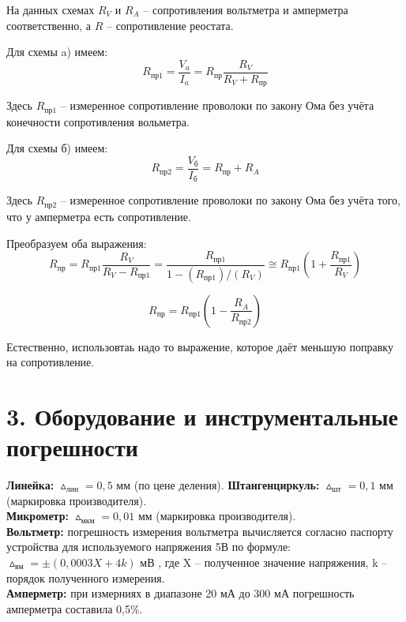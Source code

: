 На данных схемах $R_V$ и $R_A$ -- сопротивления вольтметра и амперметра соответственно, а $R$ -- сопротивление реостата.

Для схемы a) имеем:
\[R_{\text{пр1}} = \frac{V_a}{I_a} = R_{\text{пр}} \frac{R_V}{R_V + R_{\text{пр}}} \]

Здесь $R_{\text{пр1}}$ -- измеренное сопротивление проволоки по закону Ома без учёта конечности сопротивления вольметра.

Для схемы б) имеем:
\[R_{\text{пр2}} = \frac{V_{\text{б}}}{I_{\text{б}}} = R_{\text{пр}} + R_A\]

Здесь $R_{\text{пр2}}$ -- измеренное сопротивление проволоки по закону Ома без учёта того, что у амперметра есть сопротивление.

Преобразуем оба выражения:
\[R_{\text{пр}} = R_{\text{пр1}} \frac{R_V}{R_V - R_{\text{пр1}}} = \frac{R_{\text{пр1}}}{1 - (R_{\text{пр1}})/(R_V)} \cong R_{\text{пр1}} (1 + \frac{R_{\text{пр1}}}{R_V})\]

\[R_{\text{пр}} = R_{\text{пр1}} (1 - \frac{R_A}{R_{\text{пр2}}})\]

Естественно, использовтаь надо то выражение, которое даёт меньшую поправку на сопротивление.\\

\section*{3. Оборудование и инструментальные погрешности}


\textbf{Линейка:} $\vartriangle_{лин} = 0,5$ мм (по цене деления). 
\textbf{Штангенциркуль:} $\vartriangle_{шт} = 0,1$ мм (маркировка производителя).\\
\textbf{Микрометр:} $\vartriangle_{мкм} = 0,01$ мм (маркировка производителя).\\
\textbf{Вольтметр:} погрешность измерения вольтметра вычисляется согласно паспорту устройства для используемого напряжения 5В по формуле: $\vartriangle_{вм} = \pm(0,0003 X + 4 k)$ мВ , где X -- полученное значение напряжения, k -- порядок полученного измерения.\\
\textbf{Амперметр:} при измерниях в диапазоне 20 мА до 300 мА погрешность амперметра составила 0,5\%. \\



